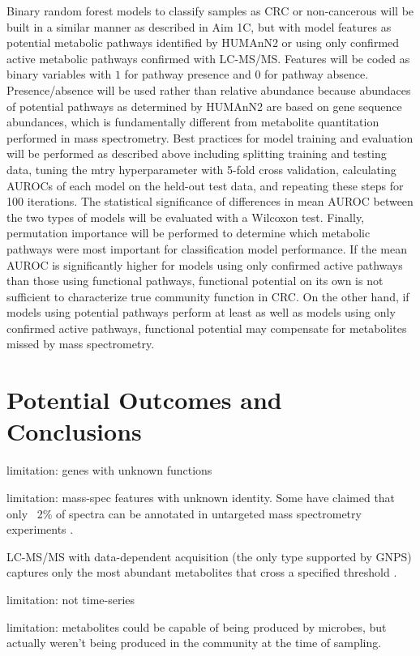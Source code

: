 \documentclass[11pt]{article}
\begin{document}
Binary random forest models to classify samples as CRC or non-cancerous will be built in a similar manner as described in Aim 1C, but with model features as potential metabolic pathways identified by HUMAnN2 or using only confirmed active metabolic pathways confirmed with LC-MS/MS.
Features will be coded as binary variables with $1$ for pathway presence and $0$ for pathway absence.
Presence/absence will be used rather than relative abundance because abundaces of potential pathways as determined by HUMAnN2 are based on gene sequence abundances, which is fundamentally different from metabolite quantitation performed in mass spectrometry.
Best practices for model training and evaluation will be performed as described above including splitting training and testing data, tuning the mtry hyperparameter with 5-fold cross validation, calculating AUROCs of each model on the held-out test data, and repeating these steps for 100 iterations.
The statistical significance of differences in mean AUROC between the two types of models will be evaluated with a Wilcoxon test.
Finally, permutation importance will be performed to determine which metabolic pathways were most important for classification model performance.
If the mean AUROC is significantly higher for models using only confirmed active pathways than those using functional pathways,
functional potential on its own is not sufficient to characterize true community function in CRC.
On the other hand, if models using potential pathways perform at least as well as models using only confirmed active pathways,
functional potential may compensate for metabolites missed by mass spectrometry.

\section*{Potential Outcomes and Conclusions}

limitation: genes with unknown functions

limitation: mass-spec features with unknown identity. Some have claimed that only ~2\% of spectra can be annotated in untargeted mass spectrometry experiments \cite{da_silva_illuminating_2015}.

LC-MS/MS with data-dependent acquisition (the only type supported by GNPS) captures only the most abundant metabolites that cross a specified threshold \cite{xiao_metabolite_2012}.

limitation: not time-series

limitation: metabolites could be capable of being produced by microbes, but actually weren't being produced in the community at the time of sampling.

\pagebreak
\footnotesize{

\par}
\end{document}
